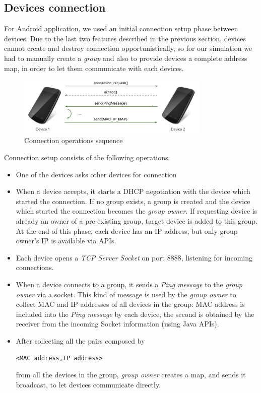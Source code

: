 \subsection{Devices connection}

For Android application, we used an initial connection setup phase between devices.
Due to the last two \direct features described in the previous section, devices cannot create and destroy connection opportunistically, so for our simulation we had to manually create a \direct \textit{group} and also to provide devices a complete address map, in order to  let them communicate with each devices.

\begin{figure}[!htbp]
\centering
\includegraphics[width=3.6in]{imgs/device_connection_ops.pdf}
\caption{Connection operations sequence}
\label{fig:device_connection}
\end{figure}

Connection setup consists of the following operations:
	\begin{itemize}
		\item One of the devices asks other devices for connection
		\item When a device accepts, it starts a DHCP negotiation with the device which started the connection. If no \direct group exists, a group is created and the device which started the connection becomes the \textit{group owner}. If requesting device is already an owner of a pre-existing group, target device is added to this group. At the end of this phase, each device has an IP address, but only group owner's IP is available via \direct APIs. 
		\item Each device opens a \textit{TCP Server Socket} on port 8888, listening for incoming connections.
		\item When a device connects to a group, it sends a \textit{Ping message} to the \textit{group owner} via a socket. This kind of message is used by the \textit{group owner} to collect MAC and IP addresses of all devices in the group: MAC address is included into the \emph{Ping message} by each device, the second is obtained by the receiver from the incoming Socket information (using Java APIs).
		\item After collecting all the pairs composed by \begin{center}\tt{<MAC address,IP address>}\end{center} from all the devices in the group, \textit{group owner} creates a map, and sends it broadcast, to let devices communicate directly.
	\end{itemize}

